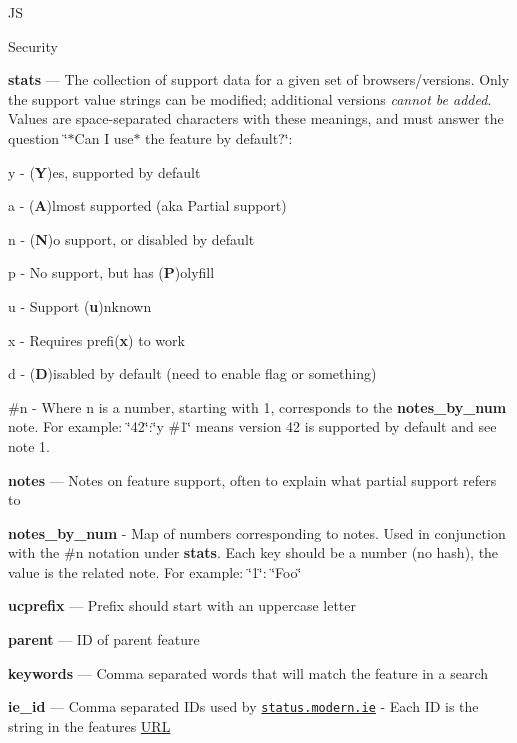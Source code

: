 \begin{DoxyItemize}
\begin{DoxyItemize}
\item {\ttfamily JS}
\item {\ttfamily Security}
\end{DoxyItemize}
\item {\bfseries stats} — The collection of support data for a given set of browsers/versions. Only the support value strings can be modified; additional versions {\itshape cannot be added}. Values are space-\/separated characters with these meanings, and must answer the question \char`\"{}$\ast$\+Can I use$\ast$ the feature by default?\char`\"{}\+:
\begin{DoxyItemize}
\item {\ttfamily y} -\/ ({\bfseries Y})es, supported by default
\item {\ttfamily a} -\/ ({\bfseries A})lmost supported (aka Partial support)
\item {\ttfamily n} -\/ ({\bfseries N})o support, or disabled by default
\item {\ttfamily p} -\/ No support, but has ({\bfseries P})olyfill
\item {\ttfamily u} -\/ Support ({\bfseries u})nknown
\item {\ttfamily x} -\/ Requires prefi({\bfseries x}) to work
\item {\ttfamily d} -\/ ({\bfseries D})isabled by default (need to enable flag or something)
\item {\ttfamily \#n} -\/ Where n is a number, starting with 1, corresponds to the {\bfseries notes\+\_\+by\+\_\+num} note. For example\+: {\ttfamily \char`\"{}42\char`\"{}\+:\char`\"{}y \#1\char`\"{}} means version 42 is supported by default and see note 1.
\end{DoxyItemize}
\item {\bfseries notes} — Notes on feature support, often to explain what partial support refers to
\item {\bfseries notes\+\_\+by\+\_\+num} -\/ Map of numbers corresponding to notes. Used in conjunction with the \#n notation under {\bfseries stats}. Each key should be a number (no hash), the value is the related note. For example\+: {\ttfamily \char`\"{}1\char`\"{}\+: \char`\"{}\+Foo\char`\"{}}
\item {\bfseries ucprefix} — Prefix should start with an uppercase letter
\item {\bfseries parent} — ID of parent feature
\item {\bfseries keywords} — Comma separated words that will match the feature in a search
\item {\bfseries ie\+\_\+id} — Comma separated I\+Ds used by \href{http://status.modern.ie}{\tt status.\+modern.\+ie} -\/ Each ID is the string in the feature\textquotesingle{}s \mbox{\hyperlink{namespace_u_r_l}{U\+RL}}

\end{DoxyItemize}
